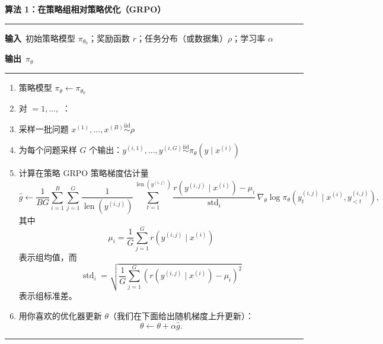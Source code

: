 \medskip
\noindent\textbf{算法 1：在策略组相对策略优化（GRPO）}
\par\nobreak\smallskip\hrule\nobreak\smallskip
\noindent\textbf{输入}\ 初始策略模型 $\pi_{\theta_0}$；奖励函数 $r$；任务分布（或数据集）$\rho$；学习率 $\alpha$

\noindent\textbf{输出}\ $\pi_\theta$
\par\nobreak\smallskip\hrule\nobreak\smallskip

\begin{enumerate}[label=\arabic*., leftmargin=2.2em, itemsep=2pt]
  \item 策略模型 $\pi_\theta \leftarrow \pi_{\theta_0}$
  \item 对  $= 1, \dots,$ ：
  \item \hspace*{1.5em}采样一批问题 $x^{(1)}, \dots, x^{(B)} \overset{\text{iid}}{\sim} \rho$
  \item \hspace*{1.5em}为每个问题采样 $G$ 个输出：$y^{(i,1)}, \dots, y^{(i,G)} \overset{\text{iid}}{\sim} \pi_\theta(y \mid x^{(i)})$
  \item \hspace*{1.5em}计算在策略 GRPO 策略梯度估计量
  \begin{equation}
  \hat{g} \leftarrow \frac{1}{BG}\sum_{i=1}^{B}\sum_{j=1}^{G} \frac{1}{\operatorname{len}(y^{(i,j)})}\sum_{t=1}^{\operatorname{len}(y^{(i,j)})} \frac{r(y^{(i,j)} \mid x^{(i)}) - \mu_i}{\operatorname{std}_i}\, \nabla_\theta \log \pi_\theta\!\left(y_t^{(i,j)} \mid x^{(i)}, y_{<t}^{(i,j)}\right),
  \end{equation}
  其中
  \begin{equation}
  \mu_i = \frac{1}{G}\sum_{j=1}^{G} r(y^{(i,j)} \mid x^{(i)})
  \end{equation}
  表示组均值，而
  \begin{equation}
  \operatorname{std}_i = \sqrt{\frac{1}{G}\sum_{j=1}^{G}\left(r(y^{(i,j)} \mid x^{(i)}) - \mu_i\right)^2}
  \end{equation}
  表示组标准差。
  \item 用你喜欢的优化器更新 $\theta$（我们在下面给出随机梯度上升更新）：
  \begin{equation}
  \theta \leftarrow \theta + \alpha \hat{g}.
  \end{equation}
\end{enumerate}
\par\nobreak\smallskip\hrule

